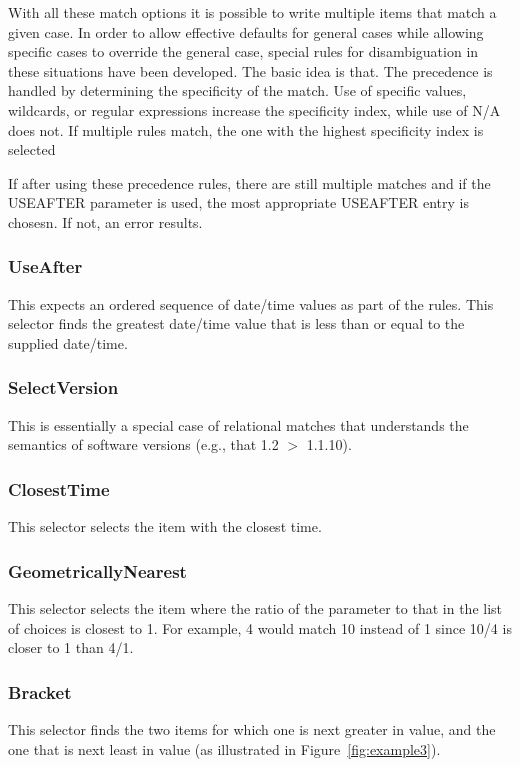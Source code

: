\documentclass[final,authoryear,5p,times,twocolumn]{elsarticle}
\begin{document}
With all these match options it is possible to write multiple items that 
match a given case. In order to allow effective defaults for general cases
while allowing specific cases to override the general case, special rules
for disambiguation in these situations have been developed. The basic idea
is that. The precedence is handled by determining the specificity of the
match. Use of specific values, wildcards, or regular expressions increase
the specificity index, while use of N/A does not. If multiple rules match,
the one with the highest specificity index is selected

If after using these precedence rules, there are still multiple matches and 
if the USEAFTER parameter is used, the most appropriate USEAFTER entry is
chosesn. If not, an error results.

\subsubsection{UseAfter}
This expects an ordered sequence of date/time values as part of the rules.
This selector finds the greatest date/time value that is less than or equal
to the supplied date/time.

\subsubsection{SelectVersion}
This is essentially a special case of relational matches that understands
the semantics of software versions (e.g., that 1.2 $>$ 1.1.10). 

\subsubsection{ClosestTime}
This selector selects the item with the closest time.

\subsubsection{GeometricallyNearest}
This selector selects the item where the ratio of the parameter to that
in the list of choices is closest to 1. For example, 4 would match 10 
instead of 1 since 10/4 is closer to 1 than 4/1.

\subsubsection{Bracket}
This selector finds the two items for which one is next greater in value,
and the one that is next least in value (as illustrated in
Figure~\ref{fig:example3}).
\end{document}
